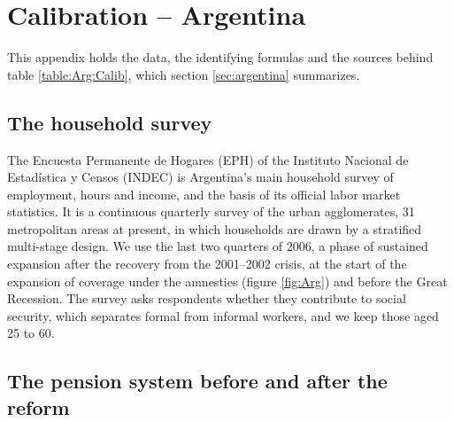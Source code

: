 \section{Calibration -- Argentina}\label{app:EPH}\setcounter{equation}{0}


This appendix holds the data, the identifying formulas and the sources behind table
\ref{table:Arg:Calib}, which section \ref{sec:argentina} summarizes.

\subsection{The household survey}

The Encuesta Permanente de Hogares (EPH) of the Instituto Nacional de Estad\'istica y Censos (INDEC) is Argentina's main household survey of employment, hours and income, and the basis of its official labor market statistics. It is a continuous quarterly survey of the urban agglomerates, 31 metropolitan areas at present, in which households are drawn by a stratified multi-stage design. We use the last two quarters of 2006, a phase of sustained expansion after the recovery from the 2001--2002 crisis, at the start of the expansion of coverage under the amnesties (figure \ref{fig:Arg}) and before the Great Recession. The survey asks respondents whether they contribute to social security, which separates formal from informal workers, and we keep those aged 25 to 60.

\subsection{The pension system before and after the reform}


